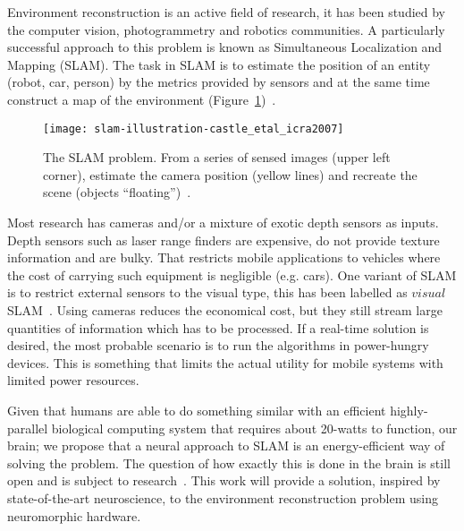 Environment reconstruction is an active field of research, it has been studied by the computer vision, photogrammetry and robotics communities. A particularly successful approach to this problem is known as Simultaneous Localization and Mapping (SLAM). The task in SLAM is to estimate the position of an entity (robot, car, person) by the metrics provided by sensors and at the same time construct a map of the environment (Figure~\ref{fig:intro:slam})~\cite{Thrun2008_SLAM}.\\[0.1em]

\begin{figure}[hb]
  \begin{center}
    \texttt{[image: slam-illustration-castle\_etal\_icra2007]}
    \caption{The SLAM problem. From a series of sensed images (upper left corner), estimate the camera position (yellow lines) and recreate the scene (objects ``floating'')~\cite{slam-oxford-images}.}
    \label{fig:intro:slam}
  \end{center}
\end{figure}

Most research has cameras and/or a mixture of exotic depth sensors as inputs.
Depth sensors such as laser range finders are expensive, do not provide texture information and are bulky. That restricts mobile applications to vehicles where the cost of carrying such equipment is negligible (e.g. cars).
One variant of SLAM is to restrict external sensors to the visual type, this has been labelled as $visual$SLAM~\cite{Fuentes-Pacheco2012-slam}. Using cameras reduces the economical cost, but they still stream large quantities of information which has to be processed. If a real-time solution is desired, the most probable scenario is to run the algorithms in power-hungry devices. This is something that limits the actual utility for mobile systems with limited power resources. 

Given that humans are able to do something similar with an efficient highly-parallel biological computing system that requires about 20-watts to function, our brain; we propose that a neural approach to SLAM is an energy-efficient way of solving the problem. The question of how exactly this is done in the brain is still open and is subject to research~\cite{rat-slam}. This work will provide a solution, inspired by state-of-the-art neuroscience, to the environment reconstruction problem using neuromorphic hardware.

